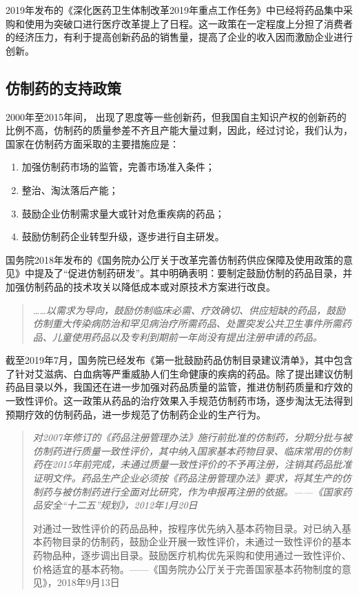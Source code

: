 \documentclass[twocolumn]{ctexbook}
\begin{document}
			2019年发布的《深化医药卫生体制改革2019年重点工作任务》中已经将药品集中采购和使用为突破口进行医疗改革提上了日程。这一政策在一定程度上分担了消费者的经济压力，有利于提高创新药品的销售量，提高了企业的收入因而激励企业进行创新。
			
			\subsection{仿制药的支持政策}
			
			2000年至2015年间， 出现了恩度等一些创新药，但我国自主知识产权的创新药的比例不高，仿制药的质量参差不齐且产能大量过剩，因此，经过讨论，我们认为，国家在仿制药方面采取的主要措施应是：
			
			\begin{enumerate}
				\item 加强仿制药市场的监管，完善市场准入条件；
				\item 整治、淘汰落后产能；
				\item 鼓励企业仿制需求量大或针对危重疾病的药品；
				\item 鼓励仿制药企业转型升级，逐步进行自主研发。
			\end{enumerate}
			
			国务院2018年发布的《国务院办公厅关于改革完善仿制药供应保障及使用政策的意见》中提及了“促进仿制药研发”。其中明确表明：要制定鼓励仿制的药品目录，并加强仿制药品的技术攻关以降低成本或对原技术方案进行改良。
			
			\begin{quotation}
				\itshape
				……以需求为导向，鼓励仿制临床必需、疗效确切、供应短缺的药品，鼓励仿制重大传染病防治和罕见病治疗所需药品、处置突发公共卫生事件所需药品、儿童使用药品以及专利到期前一年尚没有提出注册申请的药品。
			\end{quotation}
			
			截至2019年7月，国务院已经发布《第一批鼓励药品仿制目录建议清单》，其中包含了针对艾滋病、白血病等严重威胁人们生命健康的疾病的药品。除了提出建议仿制药品目录以外，我国还在进一步加强对药品质量的监管，推进仿制药质量和疗效的一致性评价。这一政策从药品的治疗效果入手规范仿制药市场，逐步淘汰无法得到预期疗效的仿制药品，进一步规范了仿制药企业的生产行为。
			
			\begin{quotation}
				\itshape
				对2007年修订的《药品注册管理办法》施行前批准的仿制药，分期分批与被仿制药进行质量一致性评价，其中纳入国家基本药物目录、临床常用的仿制药在2015年前完成，未通过质量一致性评价的不予再注册，注销其药品批准证明文件。药品生产企业必须按《药品注册管理办法》要求，将其生产的仿制药与被仿制药进行全面对比研究，作为申报再注册的依据。——《国家药品安全“十二五”规划》，2012年1月20日
				
				对通过一致性评价的药品品种，按程序优先纳入基本药物目录。对已纳入基本药物目录的仿制药，鼓励企业开展一致性评价，未通过一致性评价的基本药物品种，逐步调出目录。鼓励医疗机构优先采购和使用通过一致性评价、价格适宜的基本药物。——《国务院办公厅关于完善国家基本药物制度的意见》，2018年9月13日
			\end{quotation}
\end{document}
